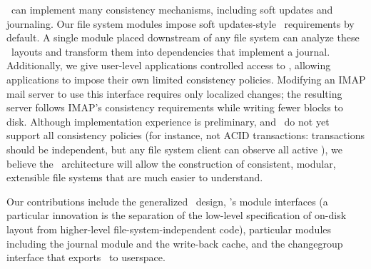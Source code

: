 \Chdescs\ can implement many consistency mechanisms, including
 soft updates and journaling.
%
Our file system modules impose soft updates-style \chdesc\
 requirements by default.
%
A single module placed downstream of any file system can analyze these
 \chdesc\ layouts and transform them into dependencies that
 implement a journal.
%
Additionally, we give user-level applications controlled access to \chdescs,
allowing applications to impose their own limited consistency
 policies.
%
Modifying an IMAP mail server to use this interface requires only localized
 changes; the resulting server follows IMAP's consistency
 requirements while writing fewer blocks to disk.
%
Although implementation experience is preliminary, and \chdescs\
 do not yet support all consistency policies (for instance, not ACID
 transactions: transactions should be independent, but any file system
 client can observe all active \chdescs), we believe the \Kudos\
 architecture will allow the construction of consistent, modular,
 extensible file systems that are much easier to understand.



Our contributions include the generalized \chdesc\ design,
 \Kudos's module interfaces (a particular innovation is the separation of
 the low-level specification of on-disk layout from higher-level
 file-system-independent code), particular modules including the journal
 module and the write-back cache, and the changegroup interface that
 exports \chdescs\ to userspace.


\begin{comment}
 The rest of this 
 A particular innovation of the
 \module\ design is the separation of the low-level specification of on-disk
 layout from higher-level file system-independent code, which operates on
 abstract disk structures.
 Our journaling \module\ can automatically add
 journaling to any file system, and combinations of simple \modules\ can support,
 for example, correct consistency on RAID over loop-back devices.
\end{comment}





